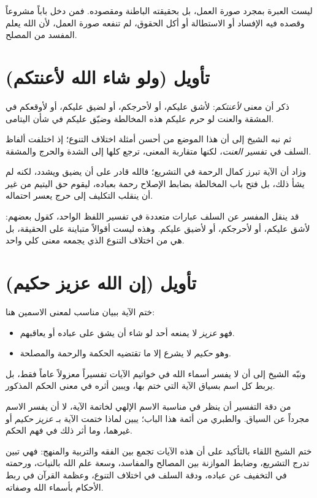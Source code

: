 \begin{fawaid}
ليست العبرة بمجرد صورة العمل، بل بحقيقته الباطنة ومقصوده. فمن دخل باباً مشروعاً وقصده فيه الإفساد أو الاستطالة أو أكل الحقوق، لم تنفعه صورة العمل، لأن الله يعلم المفسد من المصلح.
\end{fawaid}

\separator

\section{تأويل (ولو شاء الله لأعنتكم)}
ذكر  أن معنى \textit{لأعنتكم}: لأشق عليكم، أو لأحرجكم، أو لضيق عليكم، أو لأوقعكم في المشقة والعنت لو حرم عليكم هذه المخالطة وضيّق عليكم في شأن اليتامى.

ثم نبه الشيخ إلى أن هذا الموضع من أحسن أمثلة اختلاف التنوع؛ إذ اختلفت ألفاظ السلف في تفسير \textit{العنت}، لكنها متقاربة المعنى، ترجع كلها إلى الشدة والحرج والمشقة.

وزاد أن الآية تبرز كمال الرحمة في التشريع؛ فالله قادر على أن يضيق ويشدد، لكنه لم يشأ ذلك، بل فتح باب المخالطة بضابط الإصلاح رحمة بعباده، ليقوم حق اليتيم من غير أن ينقلب التكليف إلى حرج يعسر احتماله.

\begin{fawaid}
قد ينقل المفسر عن السلف عبارات متعددة في تفسير اللفظ الواحد، كقول بعضهم: لأشق عليكم، أو لأحرجكم، أو لأضيق عليكم. وهذه ليست أقوالاً متباينة على الحقيقة، بل هي من اختلاف التنوع الذي يجمعه معنى كلي واحد.
\end{fawaid}

\section{تأويل (إن الله عزيز حكيم)}
ختم  الآية ببيان مناسب لمعنى الاسمين هنا:
\begin{itemize}
    \item فهو \textit{عزيز} لا يمنعه أحد لو شاء أن يشق على عباده أو يعاقبهم.
    \item وهو \textit{حكيم} لا يشرع إلا ما تقتضيه الحكمة والرحمة والمصلحة.
\end{itemize}

ونبّه الشيخ إلى أن  لا يفسر أسماء الله في خواتيم الآيات تفسيراً معزولاً عاماً فقط، بل يربط كل اسم بسياق الآية التي ختم بها، ويبين أثره في معنى الحكم المذكور.

\begin{fawaid}
من دقة التفسير أن ينظر في مناسبة الاسم الإلهي لخاتمة الآية، لا أن يفسر الاسم مجرداً عن السياق. والطبري من أئمة هذا الباب؛ يبين لماذا ختمت الآية بـ \textit{عزيز حكيم} أو غيرهما، وما أثر ذلك في فهم الحكم.
\end{fawaid}

\separator

ختم الشيخ اللقاء بالتأكيد على أن هذه الآيات تجمع بين الفقه والتربية والمنهج: فهي تبين تدرج التشريع، وضابط الموازنة بين المصالح والمفاسد، وسعة علم الله بالنيات، ورحمته في التخفيف عن عباده، ودقة السلف في اختلاف التنوع، وعظمة القرآن في ربط الأحكام بأسماء الله وصفاته.
